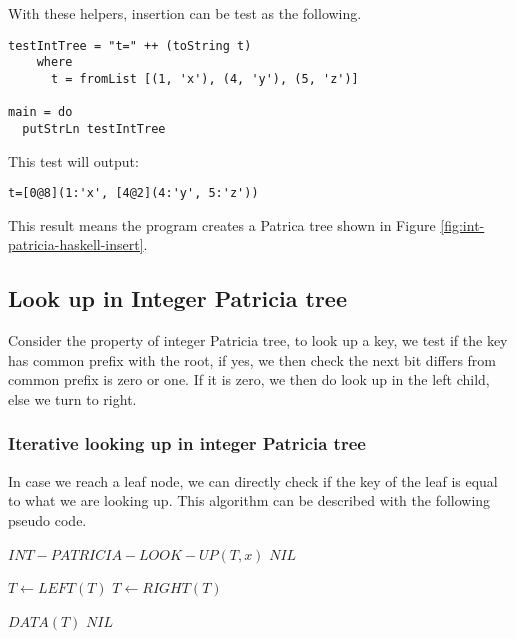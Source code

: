 \documentclass{article}
\begin{document}
With these helpers, insertion can be test as the following.

\begin{lstlisting}
testIntTree = "t=" ++ (toString t) 
    where
      t = fromList [(1, 'x'), (4, 'y'), (5, 'z')]

main = do
  putStrLn testIntTree
\end{lstlisting}

This test will output:

\begin{verbatim}
t=[0@8](1:'x', [4@2](4:'y', 5:'z'))
\end{verbatim}

This result means the program creates a Patrica tree shown in Figure \ref{fig:int-patricia-haskell-insert}.

\subsection{Look up in Integer Patricia tree}
Consider the property of integer Patricia tree, to look up a
key, we test if the key has common prefix with the root, if yes, we
then check the next bit differs from common prefix is zero or one. If
it is zero, we then do look up in the left child, else we turn to
right.

\subsubsection{Iterative looking up in integer Patricia tree}

In case we reach a leaf node, we can directly check if the key of the
leaf is equal to what we are looking up. This algorithm can be
described with the following pseudo code.

\begin{algorithmic}
\STATE $INT-PATRICIA-LOOK-UP(T, x)$
    \RETURN $NIL$ \ENDIF

      \STATE $T \leftarrow LEFT(T)$
    \ELSE
      \STATE $T \leftarrow RIGHT(T)$
    \ENDIF
  \ENDWHILE

    \RETURN $DATA(T)$ 
  \ELSE
    \RETURN $NIL$
  \ENDIF
\end{algorithmic}
\end{document}
